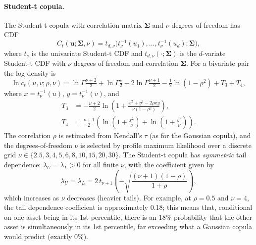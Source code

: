 \paragraph{Student-t copula.}
The Student-t copula with correlation matrix $\mathbf{\Sigma}$ and $\nu$ degrees of freedom has CDF
\begin{equation}
    C_t(\mathbf{u}; \mathbf{\Sigma}, \nu) = t_{d,\nu}\!\bigl(t_\nu^{-1}(u_1), \dots, t_\nu^{-1}(u_d); \mathbf{\Sigma}\bigr),
\end{equation}
where $t_\nu$ is the univariate Student-t CDF and $t_{d,\nu}(\cdot; \mathbf{\Sigma})$ is the $d$-variate Student-t CDF with $\nu$ degrees of freedom and correlation $\mathbf{\Sigma}$. For a bivariate pair the log-density is
\begin{equation}
    \ln c_t(u, v; \rho, \nu) = \ln\Gamma\!\tfrac{\nu+2}{2} + \ln\Gamma\!\tfrac{\nu}{2} - 2\ln\Gamma\!\tfrac{\nu+1}{2} - \tfrac{1}{2}\ln(1-\rho^2) + T_3 + T_4,
    \label{eq:t_density}
\end{equation}
where $x = t_\nu^{-1}(u)$, $y = t_\nu^{-1}(v)$, and
\begin{align}
    T_3 &= -\tfrac{\nu+2}{2}\ln\!\left(1 + \frac{x^2 + y^2 - 2\rho xy}{\nu(1-\rho^2)}\right), \\
    T_4 &= \tfrac{\nu+1}{2}\left(\ln\!\left(1+\tfrac{x^2}{\nu}\right) + \ln\!\left(1+\tfrac{y^2}{\nu}\right)\right).
\end{align}
The correlation $\rho$ is estimated from Kendall's $\tau$ (as for the Gaussian copula), and the degrees-of-freedom $\nu$ is selected by profile maximum likelihood over a discrete grid $\nu \in \{2.5, 3, 4, 5, 6, 8, 10, 15, 20, 30\}$. The Student-t copula has \emph{symmetric} tail dependence: $\lambda_U = \lambda_L > 0$ for all finite $\nu$, with the coefficient given by
\begin{equation}
    \lambda_U = \lambda_L = 2\,t_{\nu+1}\!\left(-\sqrt{\frac{(\nu+1)(1-\rho)}{1+\rho}}\right),
    \label{eq:tail_dep}
\end{equation}
which increases as $\nu$ decreases (heavier tails). For example, at $\rho = 0.5$ and $\nu = 4$, the tail dependence coefficient is approximately 0.18; this means that, conditional on one asset being in its 1st percentile, there is an 18\% probability that the other asset is simultaneously in its 1st percentile, far exceeding what a Gaussian copula would predict (exactly 0\%).

